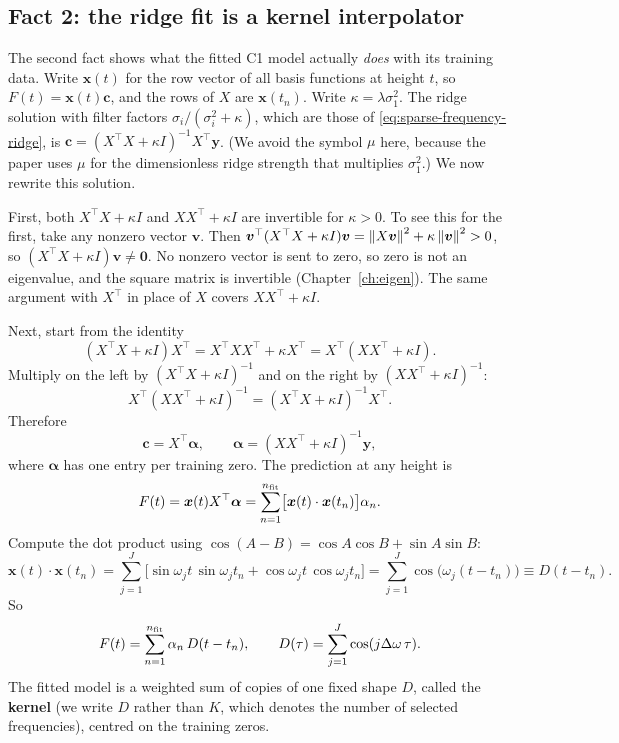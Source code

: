 \subsection{Fact 2: the ridge fit is a kernel interpolator}

The second fact shows what the fitted C1 model actually \emph{does} with its training data. Write $\bm x(t)$ for the row vector of all basis functions at height $t$, so $F(t)=\bm x(t)\bm c$, and the rows of $X$ are $\bm x(t_n)$. Write $\kappa=\lambda\sigma_1^2$. The ridge solution with filter factors $\sigma_i/(\sigma_i^2+\kappa)$, which are those of \eqref{eq:sparse-frequency-ridge}, is $\bm c=(X^\top X+\kappa I)^{-1}X^\top\bm y$. (We avoid the symbol $\mu$ here, because the paper uses $\mu$ for the dimensionless ridge strength that multiplies $\sigma_1^2$.) We now rewrite this solution.

First, both $X^\top X+\kappa I$ and $XX^\top+\kappa I$ are invertible for $\kappa>0$. To see this for the first, take any nonzero vector $\bm v$. Then $\bm v^\top(X^\top X+\kappa I)\bm v=\left\lVert X\bm v\right\rVert^2+\kappa\left\lVert \bm v\right\rVert^2>0$, so $(X^\top X+\kappa I)\bm v\ne\bm 0$. No nonzero vector is sent to zero, so zero is not an eigenvalue, and the square matrix is invertible (Chapter~\ref{ch:eigen}). The same argument with $X^\top$ in place of $X$ covers $XX^\top+\kappa I$.

Next, start from the identity
\begin{equation}
(X^\top X+\kappa I)X^\top = X^\top XX^\top+\kappa X^\top = X^\top(XX^\top+\kappa I).
\end{equation}
Multiply on the left by $(X^\top X+\kappa I)^{-1}$ and on the right by $(XX^\top+\kappa I)^{-1}$:
\begin{equation}
X^\top(XX^\top+\kappa I)^{-1}=(X^\top X+\kappa I)^{-1}X^\top .
\end{equation}
Therefore
\begin{equation}
\bm c=X^\top\bm\alpha,\qquad \bm\alpha=(XX^\top+\kappa I)^{-1}\bm y ,
\end{equation}
where $\bm\alpha$ has one entry per training zero. The prediction at any height is
\begin{equation}
F(t)=\bm x(t)X^\top\bm\alpha=\sum_{n=1}^{n_{\rm fit}}\bigl[\bm x(t)\cdot\bm x(t_n)\bigr]\alpha_n .
\end{equation}
Compute the dot product using $\cos(A-B)=\cos A\cos B+\sin A\sin B$:
\begin{equation}
\bm x(t)\cdot\bm x(t_n)=\sum_{j=1}^{J}\bigl[\sin\omega_jt\,\sin\omega_jt_n+\cos\omega_jt\,\cos\omega_jt_n\bigr]=\sum_{j=1}^{J}\cos\bigl(\omega_j(t-t_n)\bigr)\equiv D(t-t_n).
\end{equation}
So
\begin{equation}
F(t)=\sum_{n=1}^{n_{\rm fit}}\alpha_n\,D(t-t_n),\qquad D(\tau)=\sum_{j=1}^{J}\cos(j\Delta\omega\,\tau).
\label{eq:sparse-frequency-kernel}
\end{equation}
The fitted model is a weighted sum of copies of one fixed shape $D$, called the \textbf{kernel} (we write $D$ rather than $K$, which denotes the number of selected frequencies), centred on the training zeros.

